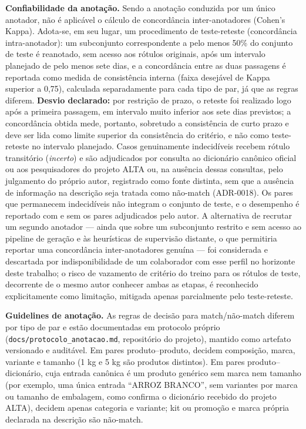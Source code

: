 \documentclass[
    article,
    12pt,
    oneside,
    a4paper,
    english,
    brazilian
    ]{abntex2}
\numberwithin{equation}{section}
\begin{document}
\textbf{Confiabilidade da anotação.} Sendo a anotação conduzida por um único anotador, não é aplicável o cálculo de concordância inter-anotadores (Cohen's Kappa). Adota-se, em seu lugar, um procedimento de teste-reteste (concordância intra-anotador): um subconjunto correspondente a pelo menos 50\% do conjunto de teste é reanotado, sem acesso aos rótulos originais, após um intervalo planejado de pelo menos sete dias, e a concordância entre as duas passagens é reportada como medida de consistência interna (faixa desejável de Kappa superior a 0,75), calculada separadamente para cada tipo de par, já que as regras diferem. \textbf{Desvio declarado:} por restrição de prazo, o reteste foi realizado logo após a primeira passagem, em intervalo muito inferior aos sete dias previstos; a concordância obtida mede, portanto, sobretudo a consistência de curto prazo e deve ser lida como limite superior da consistência do critério, e não como teste-reteste no intervalo planejado.
Casos genuinamente indecidíveis recebem rótulo transitório (\emph{incerto}) e são adjudicados por consulta ao dicionário canônico oficial ou aos pesquisadores do projeto ALTA ou, na ausência dessas consultas, pelo julgamento do próprio autor, registrado como fonte distinta, sem que a ausência de informação na descrição seja tratada como não-match (ADR-0018). Os pares que permanecem indecidíveis não integram o conjunto de teste, e o desempenho é reportado com e sem os pares adjudicados pelo autor. A alternativa de recrutar um segundo anotador --- ainda que sobre um subconjunto restrito e sem acesso ao pipeline de geração e às heurísticas de supervisão distante, o que permitiria reportar uma concordância inter-anotadores genuína --- foi considerada e descartada por indisponibilidade de um colaborador com esse perfil no horizonte deste trabalho; o risco de vazamento de critério do treino para os rótulos de teste, decorrente de o mesmo autor conhecer ambas as etapas, é reconhecido explicitamente como limitação, mitigada apenas parcialmente pelo teste-reteste.

\textbf{Guidelines de anotação.} As regras de decisão para match/não-match diferem por tipo de par e estão documentadas em protocolo próprio (\texttt{docs/protocolo\_anotacao.md}, repositório do projeto), mantido como artefato versionado e auditável. Em pares produto--produto, decidem composição, marca, variante e tamanho (1 kg e 5 kg são produtos distintos). Em pares produto--dicionário, cuja entrada canônica é um produto genérico sem marca nem tamanho (por exemplo, uma única entrada ``ARROZ BRANCO'', sem variantes por marca ou tamanho de embalagem, como confirma o dicionário recebido do projeto ALTA), decidem apenas categoria e variante; kit ou promoção e marca própria declarada na descrição são não-match.
\end{document}
